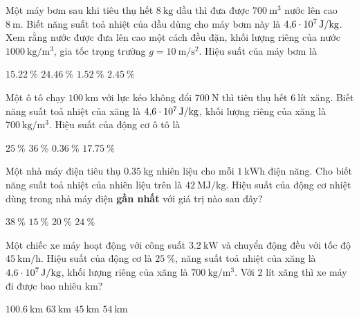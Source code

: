 \begin{ex}
	Một máy bơm sau khi tiêu thụ hết $\SI{8}{\kilogram}$ dầu thì đưa được $\SI{700}{\meter^3}$ nước lên cao $\SI{8}{\meter}$. Biết năng suất toả nhiệt của dầu dùng cho  máy bơm này là $\SI{4.6E7}{\joule/\kilogram}$. Xem rằng nước được đưa lên cao một cách đều đặn, khối lượng riêng của nước $\SI{1000}{\kilogram/\meter^3}$, gia tốc trọng trường $g=\SI{10}{\meter/\second^2}$. Hiệu suất của máy bơm là
	
	\choice
	{\True $\SI{15.22}{\percent}$}
	{$\SI{24.46}{\percent}$}
	{$\SI{1.52}{\percent}$}
	{$\SI{2.45}{\percent}$}
\end{ex}
\begin{ex}
	Một ô tô chạy $\SI{100}{\kilo\meter}$ với lực kéo không đổi $\SI{700}{\newton}$ thì tiêu thụ hết $\SI{6}{\text{lít}}$ xăng. Biết năng suất toả nhiệt của xăng là $\SI{4.6E7}{\joule/\kilogram}$, khối lượng riêng của xăng là $\SI{700}{\kilogram/\meter^3}$. Hiệu suất của động cơ ô tô là
	
	\choice
	{$\SI{25}{\percent}$}
	{\True $\SI{36}{\percent}$}
	{$\SI{0.36}{\percent}$}
	{$\SI{17.75}{\percent}$}
\end{ex}
\begin{ex}
	Một nhà máy điện tiêu thụ $\SI{0.35}{\kilogram}$ nhiên liệu cho mỗi $\SI{1}{\kilo\watt\hour}$ điện năng. Cho biết năng suất toả nhiệt của nhiên liệu trên là $\SI{42}{\mega\joule/\kilogram}$. Hiệu suất của động cơ nhiệt dùng trong nhà máy điện \textbf{gần nhất} với giá trị nào sau đây?
	
	\choice
	{$\SI{38}{\percent}$}
	{$\SI{15}{\percent}$}
	{$\SI{20}{\percent}$}
	{\True $\SI{24}{\percent}$}
\end{ex}
\begin{ex}
	Một chiếc xe máy hoạt động với công suất $\SI{3.2}{\kilo\watt}$ và chuyển động đều với tốc độ $\SI{45}{\kilo\meter/\hour}$. Hiệu suất của động cơ là $\SI{25}{\percent}$, năng suất toả nhiệt của xăng là $\SI{4.6E7}{\joule/\kilogram}$, khối lượng riêng của xăng là $\SI{700}{\kilogram/\meter^3}$. Với 2 lít xăng thì xe máy đi được bao nhiêu $\si{\kilo\meter}$?
	
	\choice
	{$\SI{100.6}{\kilo\meter}$}
	{\True $\SI{63}{\kilo\meter}$}
	{$\SI{45}{\kilo\meter}$}
	{$\SI{54}{\kilo\meter}$}
\end{ex}
